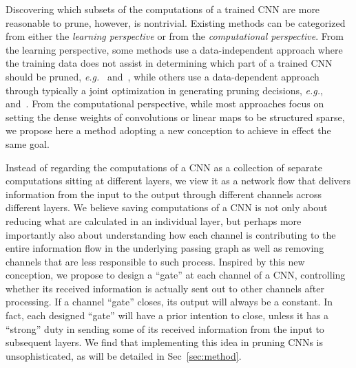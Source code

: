 \documentclass{article} %
\begin{document}
Discovering which subsets of the computations of a trained CNN are more reasonable to
prune, however, is nontrivial. Existing methods can be categorized from
either the {\it learning perspective} or from the {\it computational perspective}. From the learning perspective,
some methods use a data-independent approach where the training data does not assist
in determining which part of a trained CNN should be pruned, {\it e.g.}~\citet{he2017channel} and~\citet{zhang2016accelerating}, while others use a data-dependent
approach through typically a joint optimization in generating pruning decisions, {\it e.g.},~\citet{han2015learning} and~\citet{anwar2017structured}.
From the computational perspective, while most approaches focus on setting the dense weights of convolutions or 
linear maps to be structured sparse, we propose here a method adopting a new conception to
achieve in effect the same goal. 

Instead of regarding the computations of a CNN as a collection of separate computations sitting at different
layers, we view it as a network flow that delivers information from the input to the output
through different channels across different layers. We believe saving computations of a CNN is not only about reducing
what are calculated in an individual layer, but perhaps more importantly also about understanding how each channel is contributing to the
entire information flow in the underlying passing graph as well as removing channels that are 
less responsible to such process. Inspired by this new conception, we propose to design a ``gate'' at
each channel of a CNN, controlling whether its received information is actually sent out 
to other channels after processing. If a channel ``gate'' closes, its output will always be a constant. 
In fact, each designed ``gate'' will have a prior intention to close, unless it has a ``strong'' duty in sending
some of its received information from the input to subsequent layers. We find that implementing this idea in pruning CNNs
is unsophisticated, as will be detailed in Sec~\ref{sec:method}. 
\end{document}
